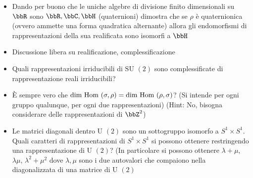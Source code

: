 \documentclass[a4paper,NoNotes,GeneralMath]{stdmdoc}
\newcommand{\SU}{\text{SU }}
\newcommand{\U}{\text{U }}
\newcommand{\Hom}{\text{Hom }}
\begin{document}
\begin{itemize}
		\item Dando per buono che le uniche algebre di divisione finito dimensionali su $\bbR$ sono $\bbR, \bbC, \bbH$ (quaternioni) dimostra che se $\rho$ è quaternionica (ovvero ammette una forma quadratica alternante) allora gli endomorfismi di rappresentazioni della sua realificata sono isomorfi a $\bbH$
		\item Discussione libera su realificazione, complessificazione
		\item Quali rappresentazioni irriducibili di $\SU(2)$ sono complessificate di rappresentazione reali irriducibili?
		\item È sempre vero che $\Dim \Hom(\sigma, \rho) = \Dim \Hom(\rho, \sigma)$? (Si intende per ogni gruppo qualunque, per ogni due rappresentazioni) (Hint: No, bisogna considerare delle rappresentazioni di $\bbZ^2$)
		\item Le matrici diagonali dentro $\U(2)$ sono un sottogruppo isomorfo a $S^1 \times S^1$. Quali caratteri di rappresentazioni di $S^1 \times S^1$ si possono ottenere restringendo una rappresentazione di $\U(2)$? (In particolare si possono ottenere $\lambda + \mu$, $\lambda\mu$, $\lambda^2 + \mu^2$ dove $\lambda, \mu$ sono i due autovalori che compaiono nella diagonalizzata di una matrice di $\U(2)$
	\end{itemize}
\end{document}
